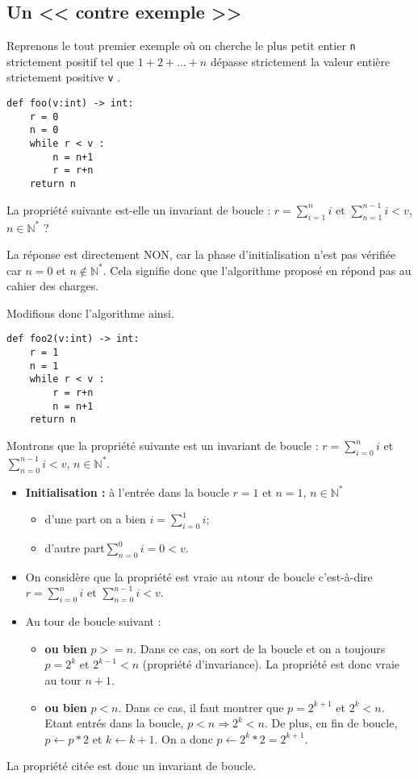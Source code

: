 \subsection{Un << contre exemple >>}


Reprenons le tout premier exemple où on cherche le plus petit entier \texttt{n} strictement positif tel que $1 + 2 + . . . + n$ dépasse strictement la valeur entière strictement positive \texttt{v} .
\begin{lstlisting}
def foo(v:int) -> int:
    r = 0
    n = 0
    while r < v : 
        n = n+1
        r = r+n
    return n
\end{lstlisting}

La propriété suivante est-elle un invariant de boucle : 
$r=\sum\limits_{i=1}^n i$ et 
$\sum\limits_{n=1}^{n-1} i < v$, 
$n\in\mathbb{N}^*$ ?

La réponse est directement NON, car la phase d'initialisation n'est pas vérifiée car $n=0$ et $n\notin\mathbb{N}^*$.
Cela signifie donc que l'algorithme proposé en répond pas au cahier des charges. 

Modifions donc l'algorithme ainsi.
\begin{lstlisting}
def foo2(v:int) -> int:
    r = 1
    n = 1
    while r < v : 
        r = r+n
        n = n+1
    return n
\end{lstlisting}

Montrons que la propriété suivante est un invariant de boucle : $r=\sum\limits_{i=0}^n i$ et 
$\sum\limits_{n=0}^{n-1} i < v$, 
$n\in\mathbb{N}^*$.

\begin{itemize}
\item \textbf{Initialisation : }à l'entrée dans la boucle $r=1$ et $n=1$, $n\in\mathbb{N}^*$
\begin{itemize}
\item d'une part  on a bien $i=\sum\limits_{i=0}^1 i$;
\item d'autre part$  \sum\limits_{n=0}^{0}i =0 < v$.
\end{itemize}
\item On considère que la propriété est vraie au $n$\ieme  tour de boucle c'est-à-dire $r=\sum\limits_{i=0}^n i$ et $\sum\limits_{n=0}^{n-1} i < v$.
\item Au tour de boucle suivant : 
\begin{itemize}
\item \textbf{ou bien} $p>=n$. Dans ce cas, on sort de la boucle et on a toujours $p=2^k$ et $2^{k-1}<n$ (propriété d'invariance). La propriété est donc vraie au tour $n+1$.
\item \textbf{ou bien} $p<n$. Dans ce cas, il faut montrer que  $p=2^{k+1}$ et $2^{k}<n$. Etant entrés dans la boucle, $p<n \Rightarrow 2^k<n$. De plus, en fin de boucle, $p\leftarrow p *2$ et $k\leftarrow k+1$. On a donc $p\leftarrow 2^k *2=2^{k+1}$. 
\end{itemize}
\end{itemize}
La propriété citée est donc un invariant de boucle. 

